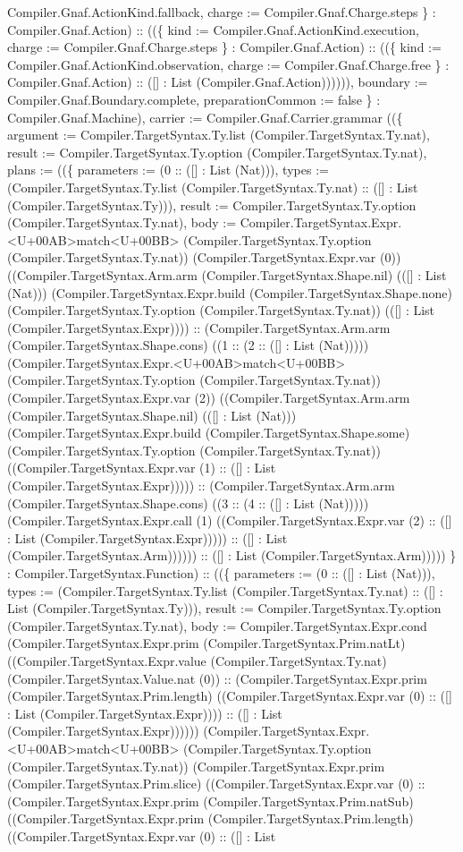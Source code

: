 \documentclass[11pt]{article}
\begin{document}
Compiler.Gnaf.ActionKind.fallback, charge := Compiler.Gnaf.Charge.steps \} : Compiler.Gnaf.Action) :: ((\{ kind := Compiler.Gnaf.ActionKind.execution, charge := Compiler.Gnaf.Charge.steps \} : Compiler.Gnaf.Action) :: ((\{ kind := Compiler.Gnaf.ActionKind.observation, charge := Compiler.Gnaf.Charge.free \} : Compiler.Gnaf.Action) :: ([] : List (Compiler.Gnaf.Action)))))), boundary := Compiler.Gnaf.Boundary.complete, preparationCommon := false \} : Compiler.Gnaf.Machine), carrier := Compiler.Gnaf.Carrier.grammar ((\{ argument := Compiler.TargetSyntax.Ty.list (Compiler.TargetSyntax.Ty.nat), result := Compiler.TargetSyntax.Ty.option (Compiler.TargetSyntax.Ty.nat), plans := ((\{ parameters := (0 :: ([] : List (Nat))), types := (Compiler.TargetSyntax.Ty.list (Compiler.TargetSyntax.Ty.nat) :: ([] : List (Compiler.TargetSyntax.Ty))), result := Compiler.TargetSyntax.Ty.option (Compiler.TargetSyntax.Ty.nat), body := Compiler.TargetSyntax.Expr.<U+00AB>match<U+00BB> (Compiler.TargetSyntax.Ty.option (Compiler.TargetSyntax.Ty.nat)) (Compiler.TargetSyntax.Expr.var (0)) ((Compiler.TargetSyntax.Arm.arm (Compiler.TargetSyntax.Shape.nil) (([] : List (Nat))) (Compiler.TargetSyntax.Expr.build (Compiler.TargetSyntax.Shape.none) (Compiler.TargetSyntax.Ty.option (Compiler.TargetSyntax.Ty.nat)) (([] : List (Compiler.TargetSyntax.Expr)))) :: (Compiler.TargetSyntax.Arm.arm (Compiler.TargetSyntax.Shape.cons) ((1 :: (2 :: ([] : List (Nat))))) (Compiler.TargetSyntax.Expr.<U+00AB>match<U+00BB> (Compiler.TargetSyntax.Ty.option (Compiler.TargetSyntax.Ty.nat)) (Compiler.TargetSyntax.Expr.var (2)) ((Compiler.TargetSyntax.Arm.arm (Compiler.TargetSyntax.Shape.nil) (([] : List (Nat))) (Compiler.TargetSyntax.Expr.build (Compiler.TargetSyntax.Shape.some) (Compiler.TargetSyntax.Ty.option (Compiler.TargetSyntax.Ty.nat)) ((Compiler.TargetSyntax.Expr.var (1) :: ([] : List (Compiler.TargetSyntax.Expr))))) :: (Compiler.TargetSyntax.Arm.arm (Compiler.TargetSyntax.Shape.cons) ((3 :: (4 :: ([] : List (Nat))))) (Compiler.TargetSyntax.Expr.call (1) ((Compiler.TargetSyntax.Expr.var (2) :: ([] : List (Compiler.TargetSyntax.Expr))))) :: ([] : List (Compiler.TargetSyntax.Arm)))))) :: ([] : List (Compiler.TargetSyntax.Arm))))) \} : Compiler.TargetSyntax.Function) :: ((\{ parameters := (0 :: ([] : List (Nat))), types := (Compiler.TargetSyntax.Ty.list (Compiler.TargetSyntax.Ty.nat) :: ([] : List (Compiler.TargetSyntax.Ty))), result := Compiler.TargetSyntax.Ty.option (Compiler.TargetSyntax.Ty.nat), body := Compiler.TargetSyntax.Expr.cond (Compiler.TargetSyntax.Expr.prim (Compiler.TargetSyntax.Prim.natLt) ((Compiler.TargetSyntax.Expr.value (Compiler.TargetSyntax.Ty.nat) (Compiler.TargetSyntax.Value.nat (0)) :: (Compiler.TargetSyntax.Expr.prim (Compiler.TargetSyntax.Prim.length) ((Compiler.TargetSyntax.Expr.var (0) :: ([] : List (Compiler.TargetSyntax.Expr)))) :: ([] : List (Compiler.TargetSyntax.Expr)))))) (Compiler.TargetSyntax.Expr.<U+00AB>match<U+00BB> (Compiler.TargetSyntax.Ty.option (Compiler.TargetSyntax.Ty.nat)) (Compiler.TargetSyntax.Expr.prim (Compiler.TargetSyntax.Prim.slice) ((Compiler.TargetSyntax.Expr.var (0) :: (Compiler.TargetSyntax.Expr.prim (Compiler.TargetSyntax.Prim.natSub) ((Compiler.TargetSyntax.Expr.prim (Compiler.TargetSyntax.Prim.length) ((Compiler.TargetSyntax.Expr.var (0) :: ([] : List 
\end{document}
